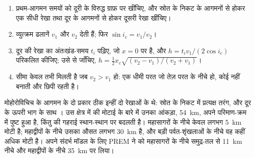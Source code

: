 \begin{method}\label{met:b1:layered-earth:moho}
\begin{enumerate}
  \item प्रथम-आगमन समयों को दूरी के विरुद्ध ग्राफ़ पर खींचिए, और स्रोत के निकट के आगमनों से होकर एक सीधी रेखा तथा दूर के आगमनों से होकर दूसरी रेखा खींचिए।
  \item व्युत्क्रम ढलानें $v_1$ और $v_2$ देती हैं; फिर $\sin i_c = v_1/v_2$।
  \item दूर की रेखा का अंतःखंड-समय $t_i$ पढ़िए, जो $x = 0$ पर है, और $h = t_i v_1/(2\cos i_c)$ परिकलित कीजिए; उसे  से जाँचिए, $h = \tfrac12 x_c\sqrt{(v_2 - v_1)/(v_2 + v_1)}$।
  \item सीमा केवल तभी मिलती है जब $v_2 > v_1$ हो: एक धीमी परत जो तेज़ परत के नीचे हो, कोई  नहीं बनाती और छिपी रहती है।
\end{enumerate}
\end{method}

मोहोरोविचिच के आगमन के दो प्रकार ठीक इन्हीं दो रेखाओं के थे: स्रोत के निकट  में प्रत्यक्ष तरंग, और दूर  के ऊपरी भाग के साथ । उस क्षेत्र में  की मोटाई के बारे में उनका आंकड़ा, \qty{54}{km}, अपने परिमाण-क्रम में पुष्ट हुआ है, किंतु  की गहराई स्थान-स्थान पर बदलती है। महासागरों के नीचे  केवल लगभग \qty{5}{km} मोटी है; महाद्वीपों के नीचे उसका औसत लगभग \qty{30}{km} है, और बड़ी पर्वत-शृंखलाओं के नीचे वह कहीं अधिक मोटी है। अपने संदर्भ मॉडल के लिए PREM ने  को महासागरों के नीचे समुद्र-तल से \qty{11}{km} नीचे और महाद्वीपों के नीचे \qty{35}{km} पर लिया।


